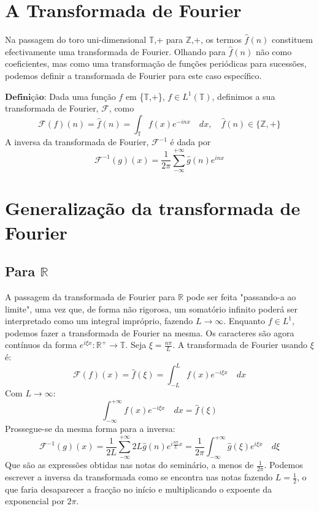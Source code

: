 \documentclass{article}
\begin{document}
\section{A Transformada de Fourier}
Na passagem do toro uni-dimensional {$\mathbb{T}$,+} para {$\mathbb{Z}$,+}, os termos \(\hat{f}(n)\) constituem efectivamente uma transformada de Fourier. Olhando para \(\hat{f}(n)\) não como coeficientes, mas como uma transformação de funções periódicas para sucessões, podemos definir a transformada de Fourier para este caso específico.

\(\textbf{Definição:}\) Dada uma função \(f\) em \{\(\mathbb{T}\),+\}, \(f\in L^1(\mathbb{T})\), definimos a sua transformada de Fourier, \(\mathcal{F}\), como
\[\mathcal{F}(f)(n)=\hat{f}(n)=\displaystyle\int_{\mathbb{T}}f(x)e^{-inx}\quad dx,\quad \hat{f}(n)\in\{\mathbb{Z},+\}\]
A inversa da transformada de Fourier, \(\mathcal{F}^{-1}\) é dada por
\[\mathcal{F}^{-1}(g)(x)=\frac{1}{2\pi}\displaystyle\sum_{-\infty}^{+\infty}\hat{g}(n)e^{inx}\]

\section{Generalização da transformada de Fourier}
\subsection{Para \(\mathbb{R}\)}
A passagem da transformada de Fourier para \(\mathbb{R}\) pode ser feita "passando-a ao limite", uma vez que, de forma não rigorosa, um somatório infinito poderá ser interpretado como um integral impróprio, fazendo \(L\to \infty\). Enquanto \(f\in L^{1}\), podemos fazer a transformada de Fourier na mesma.
Os caracteres são agora contínuos da forma \(e^{i\xi x} :\mathbb{R}^{+}\to\mathbb{T}\).
Seja \(\xi=\frac{n\pi}{L}\). A transformada de Fourier usando \(\xi\) é:
\[\mathcal{F}(f)(x)=\hat{f}(\xi)=\displaystyle\int_{-L}^{L}f(x)e^{-i\xi x}\quad dx\]
Com \(L\to\infty\):
\[\displaystyle\int_{-\infty}^{+\infty}f(x)e^{-i\xi x}\quad dx= \hat{f}(\xi)\]
Prossegue-se da mesma forma para a inversa:
\[\mathcal{F}^{-1}(g)(x)=\frac{1}{2L}\displaystyle\sum_{-\infty}^{+\infty}2L\hat{g}(n)e^{i\frac{n\pi}{L}x}=\frac{1}{2\pi}\displaystyle\int_{-\infty}^{+\infty}\hat{g}(\xi)e^{i\xi x}\quad d\xi\]
Que são as expressões obtidas nas notas do seminário\cite{drumond}, a menos de \(\frac{1}{2\pi}\). Podemos escrever a inversa da transformada como se encontra nas notas fazendo \(L=\frac{1}{2}\), o que faria desaparecer a fracção no início e multiplicando o expoente da exponencial por \(2\pi\).
\end{document}
